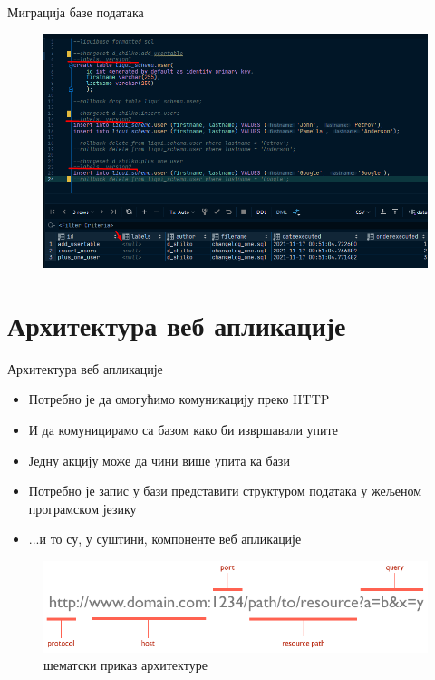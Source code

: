 \documentclass{beamer}
\begin{document}
\begin{frame}[allowframebreaks]{Миграција базе података}
        \framebreak
        
        \begin{figure}
            \centering
            \includegraphics[width=\textwidth,height=\textheight,keepaspectratio]{images/liquibase.png}
            \label{fig:liquibase}
        \end{figure}
    \end{frame}

    \section{Архитектура веб апликације}
    
    \begin{frame}[allowframebreaks]{Архитектура веб апликације}
        \begin{itemize}
            \item Потребно је да омогућимо комуникацију преко HTTP
            \item И да комуницирамо са базом како би извршавали упите
            \item Једну акцију може да чини више упита ка бази
            \item Потребно је запис у бази представити структуром података у жељеном програмском језику
            \item ...и то су, у суштини, компоненте веб апликације
        \end{itemize}
        
        \framebreak
        
        \begin{figure}
            \centering
            \includegraphics[width=\textwidth,height=\textheight,keepaspectratio]{images/url.png}
            \caption{шематски приказ архитектуре}
            \label{fig:url}
        \end{figure}
    \end{frame}
    
\end{document}
